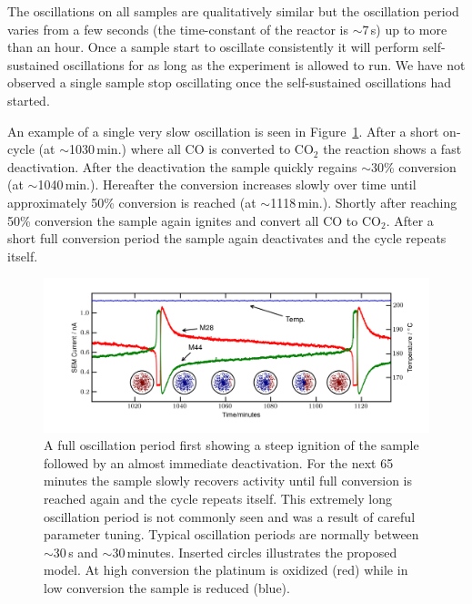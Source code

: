 \documentclass[8.5pt,twoside,twocolumn]{article}
\begin{document}
The oscillations on all samples are qualitatively similar but the oscillation period varies from a few seconds (the time-constant of the reactor is $\sim7\,$s) up to more than an hour. Once a sample start to oscillate consistently it will perform self-sustained oscillations for as long as the experiment is allowed to run. We have not observed a single sample stop oscillating once the self-sustained oscillations had started. 

An example of a single very slow oscillation is seen in Figure~\ref{fgr:full_oscillation}. After a short on-cycle (at $\sim$1030\,min.) where all CO is converted to CO$_2$ the reaction shows a fast deactivation. After the deactivation the sample quickly regains $\sim$30\% conversion (at $\sim$1040\,min.). Hereafter the conversion increases slowly over time until approximately 50\% conversion is reached (at $\sim$1118\,min.). Shortly after reaching 50\% conversion the sample again ignites and convert all CO to CO$_2$. After a short full conversion period the sample again deactivates and the cycle repeats itself.
\begin{figure}
  \centering
  \includegraphics[width=17cm]{single_full_oscillation.png}
  \caption{A full oscillation period first showing a steep ignition of the sample followed by an almost immediate deactivation. For the next 65 minutes the sample slowly recovers activity until full conversion is reached again and the cycle repeats itself. This extremely long oscillation period is not commonly seen and was a result of careful parameter tuning. Typical oscillation periods are normally between $\sim$30\,s and $\sim$30\,minutes. Inserted circles illustrates the proposed model. At high conversion the platinum is oxidized (red) while in low conversion the sample is reduced (blue).}
  \label{fgr:full_oscillation}
\end{figure}
\end{document}
